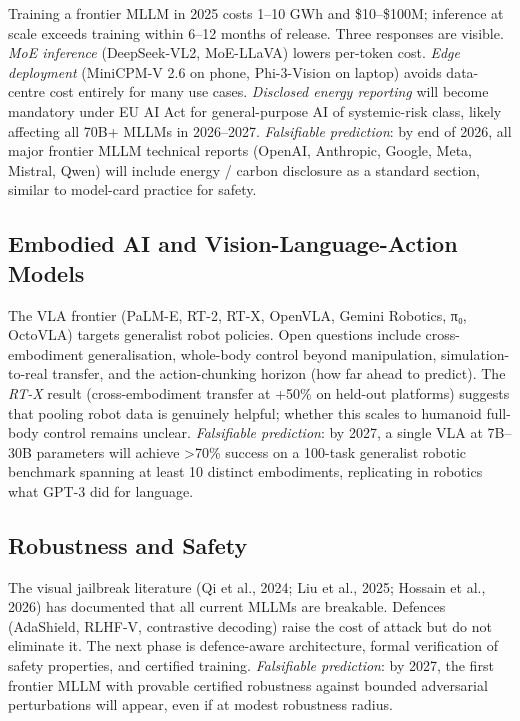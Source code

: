 \documentclass{article}
\begin{document}
Training a frontier MLLM in 2025 costs 1--10 GWh and \$10--\$100M; inference at scale exceeds training within 6--12 months of release. Three responses are visible. \emph{MoE inference} (DeepSeek-VL2, MoE-LLaVA) lowers per-token cost. \emph{Edge deployment} (MiniCPM-V 2.6 on phone, Phi-3-Vision on laptop) avoids data-centre cost entirely for many use cases. \emph{Disclosed energy reporting} will become mandatory under EU AI Act for general-purpose AI of systemic-risk class, likely affecting all 70B+ MLLMs in 2026--2027. \emph{Falsifiable prediction}: by end of 2026, all major frontier MLLM technical reports (OpenAI, Anthropic, Google, Meta, Mistral, Qwen) will include energy / carbon disclosure as a standard section, similar to model-card practice for safety.

\subsection{Embodied AI and Vision-Language-Action Models}\label{embodied-ai-and-vision-language-action-models}

The VLA frontier (PaLM-E, RT-2, RT-X, OpenVLA, Gemini Robotics, π₀, OctoVLA) targets generalist robot policies. Open questions include cross-embodiment generalisation, whole-body control beyond manipulation, simulation-to-real transfer, and the action-chunking horizon (how far ahead to predict). The \emph{RT-X} result (cross-embodiment transfer at +50\% on held-out platforms) suggests that pooling robot data is genuinely helpful; whether this scales to humanoid full-body control remains unclear. \emph{Falsifiable prediction}: by 2027, a single VLA at 7B--30B parameters will achieve \textgreater70\% success on a 100-task generalist robotic benchmark spanning at least 10 distinct embodiments, replicating in robotics what GPT-3 did for language.

\subsection{Robustness and Safety}\label{robustness-and-safety}

The visual jailbreak literature (Qi et al., 2024; Liu et al., 2025; Hossain et al., 2026) has documented that all current MLLMs are breakable. Defences (AdaShield, RLHF-V, contrastive decoding) raise the cost of attack but do not eliminate it. The next phase is defence-aware architecture, formal verification of safety properties, and certified training. \emph{Falsifiable prediction}: by 2027, the first frontier MLLM with provable certified robustness against bounded adversarial perturbations will appear, even if at modest robustness radius.
\end{document}
